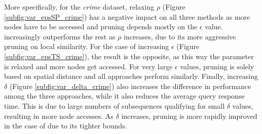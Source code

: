 More specifically, for the {\em crime} dataset, relaxing $\rho$ (Figure \ref{subfig:var_epsSP_crime}) has a negative impact on all three methods as more nodes have to be accessed and pruning depends mostly on the $\epsilon$ value. \sbtsr increasingly outperforms the rest as $\rho$ increases, due to its more aggressive pruning on local similarity. For the case of increasing $\epsilon$ (Figure \ref{subfig:var_epsTS_crime}), the result is the opposite, as this way the parameter is relaxed and more nodes get accessed. For very large $\epsilon$ values, pruning is solely based on spatial distance and all approaches perform similarly. Finally, increasing $\delta$ (Figure \ref{subfig:var_delta_crime}) also increases the difference in performance among the three approaches, while it also reduces the average query response time. This is due to large numbers of subsequences qualifying for small $\delta$ values, resulting in more node accesses. As $\delta$ increases, pruning is more rapidly improved in the case of \sbtsr due to its tighter bounds.

